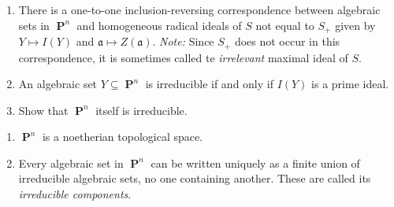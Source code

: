 \documentclass{/Users/SHER/Documents/Hartshorne-Exercises/hw_pset} %
\DeclareMathOperator{\pp}{\mathbf{P}} %
\begin{document}
\begin{solution}

\end{solution}

\begin{exercise}[Exercise 2.4]
    \begin{enumerate}
        \item There is a one-to-one inclusion-reversing correspondence between
        algebraic sets in $\pp^n$ and homogeneous radical ideals of $S$ not equal
        to $S_+$ given by $Y \mapsto I(Y)$ and $\mathfrak{a} \mapsto
        Z(\mathfrak{a})$. \emph{Note:} Since $S_{+}$ does not occur in this correspondence, 
        it is sometimes called te \emph{irrelevant} maximal ideal of $S$. 
        
        \item An algebraic set $Y \subseteq \pp^n$ is irreducible if and only if $I(Y)$ is a prime ideal. 
        \item Show that $\pp^n$ itself is irreducible. 
    \end{enumerate}
\end{exercise}

\begin{solution}

\end{solution}

\begin{exercise}[Exercise 2.5]
    \begin{enumerate}
        \item $\pp^n$ is a noetherian topological space. 
        \item Every algebraic set in $\pp^n$ can be written uniquely as a finite
          union of irreducible algebraic sets, no one containing another. These are
          called its \emph{irreducible components}. 
    \end{enumerate}
\end{exercise}

\begin{solution}

\end{solution}
\end{document}
